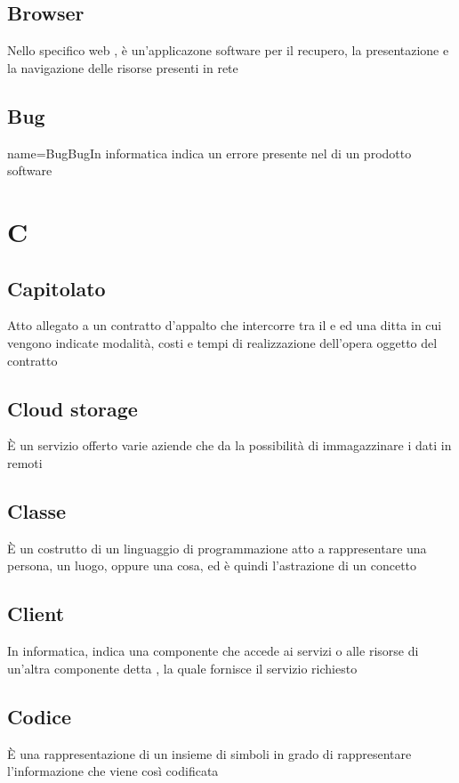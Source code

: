 		\subsection{Browser}
		Nello specifico web , è un'applicazone software per il recupero, la presentazione e la navigazione delle risorse presenti in rete


		\subsection{Bug}{name={BugBug}In informatica indica un errore presente nel  di un prodotto software

\section{C}
	   \subsection{Capitolato}
	   Atto allegato a un contratto d'appalto che intercorre tra il e ed una ditta in cui vengono indicate modalità, costi e tempi di realizzazione dell'opera oggetto del contratto


		 \subsection{Cloud storage}
		 È un servizio offerto varie aziende che da la possibilità di immagazzinare i dati in  remoti


	   \subsection{Classe}
	   È un costrutto di un linguaggio di programmazione atto a rappresentare una persona, un luogo, oppure una cosa, ed è quindi l'astrazione di un concetto


	    \subsection{Client}
	    In informatica, indica una componente che accede ai servizi o alle risorse di un'altra componente detta , la quale fornisce il servizio richiesto


	    \subsection{Codice}
	    È una rappresentazione di un insieme di simboli in grado di rappresentare l'informazione che viene così codificata


}
